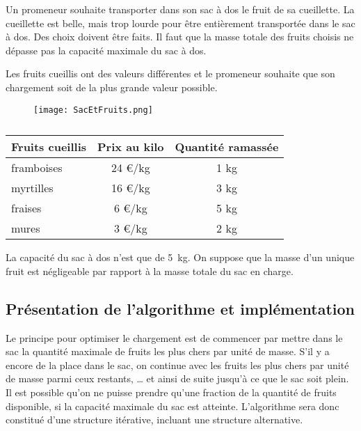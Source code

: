 \setcounter{numques}{0}

Un promeneur souhaite transporter dans son sac à dos le fruit de sa cueillette. La cueillette est belle, mais trop lourde pour être entièrement transportée dans le sac à dos. Des choix doivent être faits. Il faut que la masse totale des fruits choisis ne dépasse pas la capacité maximale du sac à dos.

Les fruits cueillis ont des valeurs différentes et le promeneur souhaite que son chargement soit de la plus grande valeur possible.

\begin{figure}[h]
\centering
\texttt{[image: SacEtFruits.png]}
\label{fig:SacEtFruits}
\end{figure}



\begin{table}[h]
\centering
\begin{tabular}{|l|c|c|}
\hline
Fruits cueillis	& Prix au kilo & Quantité ramassée\\
\hline
framboises& 24 €/kg  & 1 kg \\
myrtilles & 16 €/kg & 3 kg  \\
fraises & 6 €/kg & 5 kg \\
mures & 3 €/kg & 2 kg \\
\hline
\end{tabular}
\caption{}
\label{tab_fruit}
\end{table}

La capacité du sac à dos n’est que de \SI{5}{kg}.
On suppose que la masse d’un unique fruit est négligeable par rapport à la masse totale du sac en charge.

\subsection*{Présentation de l’algorithme et implémentation}
\label{sec:PrésentationDeLAlgorithmeEtImplémentation}

Le principe pour optimiser le chargement est de commencer par mettre dans le sac la quantité maximale de fruits les plus chers par unité de masse. S’il y a encore de la place dans le sac, on continue avec les fruits les plus chers par unité de masse parmi ceux restants, … et ainsi de suite jusqu’à ce que le sac soit plein. Il est possible qu’on ne puisse prendre qu’une fraction de la quantité de fruits disponible, si la capacité maximale du sac est atteinte. L’algorithme sera donc constitué d’une structure itérative, incluant une structure alternative.

